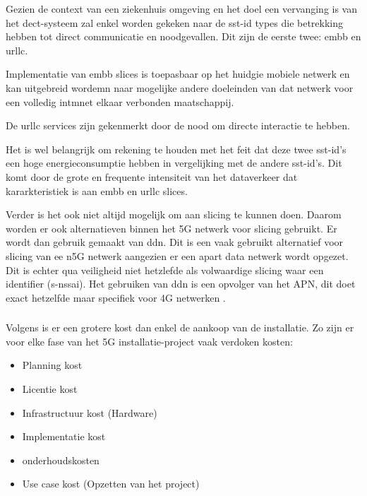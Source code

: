 Gezien de context van een ziekenhuis omgeving en het doel een vervanging is van het \gls{dect}-systeem zal enkel worden gekeken naar de \gls{sst-id} types die betrekking hebben tot direct communicatie en noodgevallen. Dit zijn de eerste twee: \gls{embb} en \gls{urllc}.

Implementatie van \gls{embb} slices is toepasbaar op het huidgie mobiele netwerk en kan uitgebreid wordemn naar mogelijke andere doeleinden van dat netwerk voor een volledig intmnet elkaar verbonden maatschappij. \autocite{Lorincz2024}

De \gls{urllc} services zijn gekenmerkt door de nood om directe interactie te hebben. 

Het is wel belangrijk om rekening te houden met het feit dat deze twee \gls{sst-id}'s een hoge energieconsumptie hebben in vergelijking met de andere \gls{sst-id}'s. Dit komt door de grote en frequente intensiteit van het dataverkeer dat kararkteristiek is aan \gls{embb} en \gls{urllc} slices. \autocite{Lorincz2024}

Verder is het ook niet altijd mogelijk om aan slicing te kunnen doen. Daarom worden er ook alternatieven binnen het 5G netwerk voor slicing gebruikt. Er wordt dan gebruik gemaakt van \gls{ddn}. Dit is een vaak gebruikt alternatief voor slicing van ee n5G netwerk aangezien er een apart data netwerk wordt opgezet. Dit is echter qua veiligheid niet hetzlefde als volwaardige slicing waar een identifier (\gls{s-nssai}). Het gebruiken van \gls{ddn} is een opvolger van het \gls{APN}, dit doet exact hetzelfde maar specifiek voor 4G netwerken \autocite{Eede2023}.

\subsubsection{}
\label{sec:Cost}

Volgens \textcite{Abbas2024} is er een grotere kost dan enkel de aankoop van de installatie. Zo zijn er voor elke fase van het 5G installatie-project vaak verdoken kosten:

\begin{itemize}
  \item Planning kost
  \item Licentie kost 
  \item Infrastructuur kost (Hardware)
  \item Implementatie kost
  \item onderhoudskosten
  \item Use case kost (Opzetten van het project)
\end{itemize}

